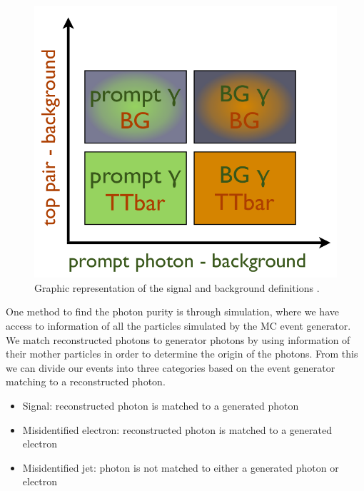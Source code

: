 \begin{figure} 
\begin{center}
\includegraphics[scale=0.33]{Figures/SignalPhotonPlot.png}
\end{center}
\caption{Graphic representation of the signal and background definitions \cite{MishaThesis}.}
\label{fig-signalphotonplot}
\end{figure} 

One method to find the photon purity is through simulation, where we have access to information of all the particles simulated by the MC event generator. We match reconstructed photons to generator photons by using information of their mother particles in order to determine the origin of the photons. From this we can divide our events into three categories based on the event generator matching to a reconstructed photon. 

\begin{itemize}
	\item Signal: reconstructed photon is matched to a generated photon
	\item Misidentified electron: reconstructed photon is matched to a generated electron
	\item Misidentified jet: photon is not matched to either a generated photon or electron
\end{itemize}

